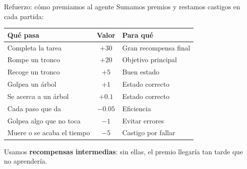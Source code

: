 \documentclass[aspectratio=169,10pt]{beamer}
\newcommand{\hl}[1]{\textcolor{UDCmag}{\textbf{#1}}}
\begin{document}
\begin{frame}{Refuerzo: cómo premiamos al agente}
  \centering
  {\small Sumamos premios y restamos castigos en cada partida:}

  \vspace{0.4em}
  \renewcommand{\arraystretch}{1.15}
  \footnotesize
  \begin{tabular}{@{}lcl@{}}
    \toprule
    \textbf{Qué pasa} & \textbf{Valor} & \textbf{Para qué}\\
    \midrule
    Completa la tarea       & \hl{$+30$}  & Gran recompensa final\\
    Rompe un tronco         & \hl{$+20$}  & Objetivo principal\\
    Recoge un tronco        & $+5$        & Buen estado\\
    \addlinespace[2pt]
    Golpea un árbol         & $+1$        & Estado correcto\\
    Se acerca a un árbol    & $+0.1$      & Estado correcto\\
    \addlinespace[2pt]
    Cada paso que da        & $-0.05$     & Eficiencia\\
    Golpea algo que no toca & $-1$        & Evitar errores\\
    Muere o se acaba el tiempo & $-5$     & Castigo por fallar\\
    \bottomrule
  \end{tabular}

  \vspace{0.6em}
  \footnotesize Usamos \hl{recompensas intermedias}: sin ellas, el premio llegaría tan tarde que no aprendería.
\end{frame}
\end{document}
